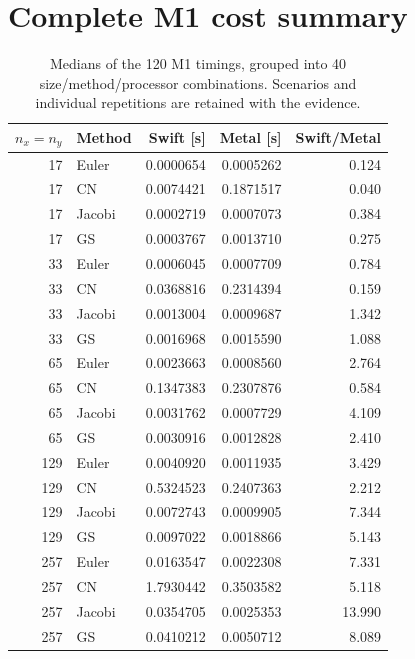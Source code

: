\documentclass[11pt,a4paper]{article}
\begin{document}
\section{Complete M1 cost summary}
\begin{table}[H]\centering\small
\caption{Medians of the 120 M1 timings, grouped into 40 size/method/processor combinations. Scenarios and individual repetitions are retained with the evidence.}\label{tab:full-cost}
\begin{tabular}{@{}rlrrr@{}}\toprule
$n_x=n_y$ & Method & Swift [s] & Metal [s] & Swift/Metal\\\midrule
17 & Euler & 0.0000654 & 0.0005262 & 0.124\\
17 & CN & 0.0074421 & 0.1871517 & 0.040\\
17 & Jacobi & 0.0002719 & 0.0007073 & 0.384\\
17 & GS & 0.0003767 & 0.0013710 & 0.275\\
33 & Euler & 0.0006045 & 0.0007709 & 0.784\\
33 & CN & 0.0368816 & 0.2314394 & 0.159\\
33 & Jacobi & 0.0013004 & 0.0009687 & 1.342\\
33 & GS & 0.0016968 & 0.0015590 & 1.088\\
65 & Euler & 0.0023663 & 0.0008560 & 2.764\\
65 & CN & 0.1347383 & 0.2307876 & 0.584\\
65 & Jacobi & 0.0031762 & 0.0007729 & 4.109\\
65 & GS & 0.0030916 & 0.0012828 & 2.410\\
129 & Euler & 0.0040920 & 0.0011935 & 3.429\\
129 & CN & 0.5324523 & 0.2407363 & 2.212\\
129 & Jacobi & 0.0072743 & 0.0009905 & 7.344\\
129 & GS & 0.0097022 & 0.0018866 & 5.143\\
257 & Euler & 0.0163547 & 0.0022308 & 7.331\\
257 & CN & 1.7930442 & 0.3503582 & 5.118\\
257 & Jacobi & 0.0354705 & 0.0025353 & 13.990\\
257 & GS & 0.0410212 & 0.0050712 & 8.089\\
\bottomrule\end{tabular}\end{table}
\end{document}
